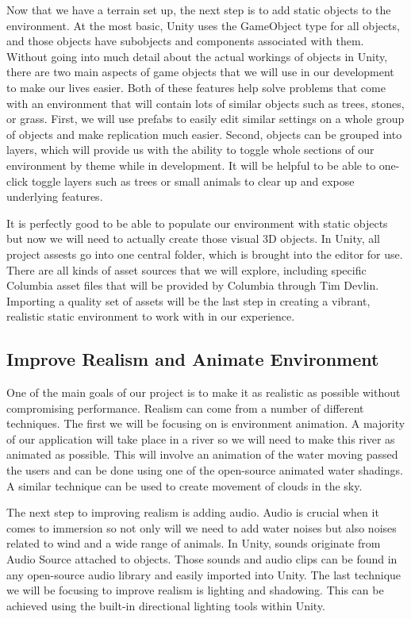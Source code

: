 \documentclass[10pt,journal,compsoc,onecolumn, draftclsnofoot]{IEEEtran}
\begin{document}
Now that we have a terrain set up, the next step is to add static objects to
the environment. At the most basic, Unity uses the GameObject type for all
objects, and those objects have subobjects and components associated with them.
\cite{ray} Without going into much detail about the actual workings of objects
in Unity, there are two main aspects of game objects that we will use in our
development to make our lives easier. \cite{} Both of these features help solve
problems that come with an environment that will contain lots of similar
objects such as trees, stones, or grass. First, we will use prefabs to easily
edit similar settings on a whole group of objects and make replication much
easier. \cite{ray} Second, objects can be grouped into layers, which will
provide us with the ability to toggle whole sections of our environment by
theme while in development. \cite{layers_video} It will be helpful to be able
to one-click toggle layers such as trees or small animals to clear up and
expose underlying features.

It is perfectly good to be able to populate our environment with static objects
but now we will need to actually create those visual 3D objects. In Unity,
all project assests go into one central folder, which is brought into the
editor for use. \cite{unity_importing_assets} There are all kinds of asset
sources that we will explore, including specific Columbia asset files that will
be provided by Columbia through Tim Devlin. Importing a quality set of assets
will be the last step in creating a vibrant, realistic static environment to
work with in our experience. 

\subsection{Improve Realism and Animate Environment}
One of the main goals of our project is to make it as realistic as possible
without compromising performance. Realism can come from a number of different
techniques. The first we will be focusing on is environment animation. A
majority of our application will take place in a river so we will need to make
this river as animated as possible. This will involve an animation of the
water moving passed the users and can be done using one of the open-source
animated water shadings. A similar technique can be used to create movement of
clouds in the sky.

The next step to improving realism is adding audio. Audio is crucial when it
comes to immersion so not only will we need to add water noises but also noises
related to wind and a wide range of animals. In Unity, sounds originate from
Audio Source attached to objects. Those sounds and audio clips can be found in
any open-source audio library and easily imported into Unity. The last
technique we will be focusing to improve realism is lighting and shadowing.
This can be achieved using the built-in directional lighting tools within Unity.
\end{document}
